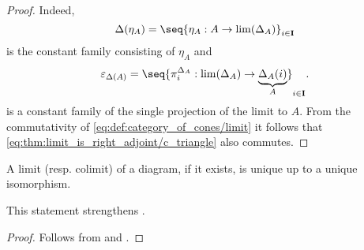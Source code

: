 \begin{proof}
  Indeed,
  \begin{equation*}
    \Delta(\eta_A) = \seq{ \eta_A: A \to \lim(\Delta_A) }_{i \in \cat{I}}
  \end{equation*}
  is the constant family consisting of \( \eta_A \) and
  \begin{equation*}
    \varepsilon_{\Delta(A)} = \seq{ \pi_i^{\Delta_A}: \lim(\Delta_A) \to \underbrace{\Delta_A(i)}_{A} }_{i \in \cat{I}}.
  \end{equation*}
  is a constant family of the single projection of the limit to \( A \). From the commutativity of \eqref{eq:def:category_of_cones/limit} it follows that \eqref{eq:thm:limit_is_right_adjoint/c_triangle} also commutes.
\end{proof}

\begin{corollary}\label{thm:categorical_limit_uniqueness}
  A limit (resp. colimit) of a diagram, if it exists, is unique up to a unique isomorphism.

  This statement strengthens .
\end{corollary}
\begin{proof}
  Follows from  and .
\end{proof}

